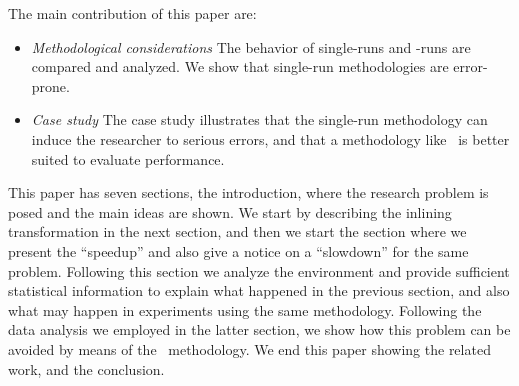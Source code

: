 The main contribution of this paper are:
\begin{itemize}
\item {\it Methodological considerations} The behavior of single-runs and \CP-runs are compared and analyzed. We show that single-run methodologies are error-prone.

\item {\it Case study} The case study illustrates that the single-run methodology can induce the researcher to serious errors, and that a methodology like \CP\ is better suited to evaluate performance.

\end{itemize}


This paper has seven sections, the introduction, where the research problem is posed and the main ideas are shown. We start by describing the inlining transformation in the next section, and then we start the section where we present the ``speedup'' and also give a notice on a ``slowdown'' for the same problem. Following this section we analyze the environment and provide sufficient statistical information to explain what happened in the previous section, and also what may happen in experiments using the same methodology. Following the data analysis we employed in the latter section, we show how this problem can be avoided by means of the \CP\ methodology. We end this paper showing the related work, and the conclusion.
